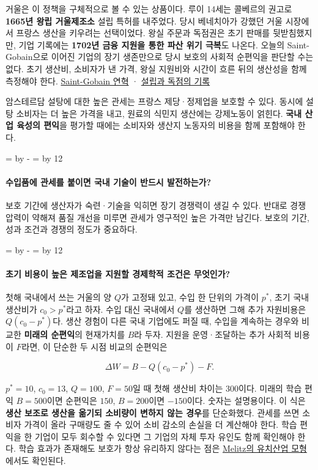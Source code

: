 \documentclass[10pt,a4paper]{article}
\newcommand{\ReserveQuestionSpace}{%
  \par\begingroup
  \dimen0=\pagegoal \advance\dimen0 by -\pagetotal
  \dimen2=\baselineskip \multiply\dimen2 by 12
  \ifdim\dimen0<\dimen2 \newpage\fi
  \endgroup}
\begin{document}
거울은 이 정책을 구체적으로 볼 수 있는 상품이다. 루이 14세는 콜베르의 권고로 \textbf{1665년 왕립 거울제조소} 설립 특허를 내주었다. 당시 베네치아가 강했던 거울 시장에서 프랑스 생산을 키우려는 선택이었다. 왕실 주문과 독점권은 초기 판매를 뒷받침했지만, 기업 기록에는 \textbf{1702년 금융 지원을 통한 파산 위기 극복}도 나온다. 오늘의 Saint-Gobain으로 이어진 기업의 장기 생존만으로 당시 보호의 사회적 순편익을 판단할 수는 없다. 초기 생산비, 소비자가 낸 가격, 왕실 지원비와 시간이 흐른 뒤의 생산성을 함께 측정해야 한다. \href{https://archives.saint-gobain.com/decouvrir-nos-histoires/chronologie}{Saint-Gobain 연혁} · \href{https://www.saint-gobain.com/en/group/our-history}{설립과 독점의 기록}\par

암스테르담 설탕에 대한 높은 관세는 프랑스 제당·정제업을 보호할 수 있다. 동시에 설탕 소비자는 더 높은 가격을 내고, 원료의 식민지 생산에는 강제노동이 얽힌다. \textbf{국내 산업 육성의 편익}을 평가할 때에는 소비자와 생산지 노동자의 비용을 함께 포함해야 한다.\par

\ReserveQuestionSpace
\paragraph{수입품에 관세를 붙이면 국내 기술이 반드시 발전하는가?}
보호 기간에 생산자가 숙련·기술을 익히면 장기 경쟁력이 생길 수 있다. 반대로 경쟁 압력이 약해져 품질 개선을 미루면 관세가 영구적인 높은 가격만 남긴다. 보호의 기간, 성과 조건과 경쟁의 정도가 중요하다.\par

\ReserveQuestionSpace
\paragraph{초기 비용이 높은 제조업을 지원할 경제학적 조건은 무엇인가?}
첫해 국내에서 쓰는 거울의 양 $Q$가 고정돼 있고, 수입 한 단위의 가격이 $p^*$, 초기 국내 생산비가 $c_0>p^*$라고 하자. 수입 대신 국내에서 $Q$를 생산하면 그해 추가 자원비용은 $Q(c_0-p^*)$다. 생산 경험이 다른 국내 기업에도 퍼질 때, 수입을 계속하는 경우와 비교한 \textbf{미래의 순편익}의 현재가치를 $B$라 두자. 지원을 운영·조달하는 추가 사회적 비용이 $F$라면, 이 단순한 두 시점 비교의 순편익은\par

\[
\Delta W=B-Q(c_0-p^*)-F.
\]

$p^*=10$, $c_0=13$, $Q=100$, $F=50$일 때 첫해 생산비 차이는 300이다. 미래의 학습 편익 $B=500$이면 순편익은 $150$, $B=200$이면 $-150$이다. 숫자는 설명용이다. 이 식은 \textbf{생산 보조로 생산을 옮기되 소비량이 변하지 않는 경우}를 단순화했다. 관세를 쓰면 소비자 가격이 올라 구매량도 줄 수 있어 소비 감소의 손실을 더 계산해야 한다. 학습 편익을 한 기업이 모두 회수할 수 있다면 그 기업의 자체 투자 유인도 함께 확인해야 한다. 학습 효과가 존재해도 보호가 항상 유리하지 않다는 점은 \href{https://dash.harvard.edu/entities/publication/73120378-81a9-6bd4-e053-0100007fdf3b}{Melitz의 유치산업 모형}에서도 확인된다.\par
\end{document}
